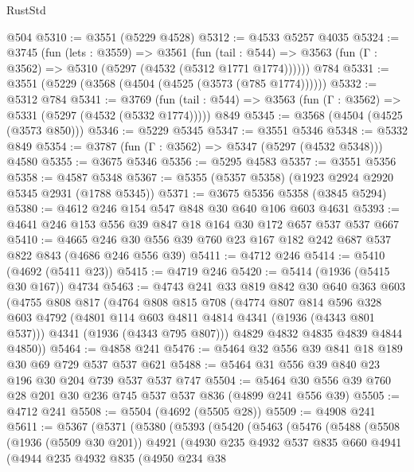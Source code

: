 \begin{lexlean}{RustStd}
\begin{coremodule}
    @504
@5310 := @3551 (@5229 @4528)
@5312 := @4533 @5257 @4035
@5324 := @3745
    (fun (lets : @3559) =>
    @3561
      (fun (tail : @544) => @3563 (fun (Γ : @3562) => @5310 (@5297 (@4532 (@5312 @1771 @1774))))))
    @784
@5331 := @3551 (@5229 (@3568 (@4504 (@4525 (@3573 (@785 @1774))))))
@5332 := @5312 @784
@5341 := @3769
    (fun (tail : @544) => @3563 (fun (Γ : @3562) => @5331 (@5297 (@4532 (@5332 @1774)))))
    @849
@5345 := @3568 (@4504 (@4525 (@3573 @850)))
@5346 := @5229 @5345
@5347 := @3551 @5346
@5348 := @5332 @849
@5354 := @3787 (fun (Γ : @3562) => @5347 (@5297 (@4532 @5348))) @4580
@5355 := @3675 @5346
@5356 := @5295 @4583
@5357 := @3551 @5356
@5358 := @4587 @5348
@5367 := @5355 (@5357 @5358) (@1923 @2924 @2920 @5345 @2931 (@1788 @5345))
@5371 := @3675 @5356 @5358 (@3845 @5294)
@5380 := @4612 @246 @154 @547 @848 @30 @640 @106 @603 @4631
@5393 := @4641 @246 @153 @556 @39 @847 @18 @164 @30 @172 @657 @537 @537 @667
@5410 := @4665 @246 @30 @556 @39 @760 @23 @167 @182 @242 @687 @537 @822 @843 (@4686 @246 @556 @39)
@5411 := @4712 @246
@5414 := @5410 (@4692 (@5411 @23))
@5415 := @4719 @246
@5420 := @5414 (@1936 (@5415 @30 @167)) @4734
@5463 := @4743
    @241
    @33
    @819
    @842
    @30
    @640
    @363
    @603
    (@4755
      @808
      @817
      (@4764
        @808
        @815
        @708
        (@4774
          @807
          @814
          @596
          @328
          @603
          @4792
          (@4801 @114 @603 @4811 @4814 @4341 (@1936 (@4343 @801 @537)))
          @4341
          (@1936 (@4343 @795 @807)))
        @4829
        @4832
        @4835
        @4839
        @4844
        @4850))
@5464 := @4858 @241
@5476 := @5464 @32 @556 @39 @841 @18 @189 @30 @69 @729 @537 @537 @621
@5488 := @5464 @31 @556 @39 @840 @23 @196 @30 @204 @739 @537 @537 @747
@5504 := @5464 @30 @556 @39 @760 @28 @201 @30 @236 @745 @537 @537 @836 (@4899 @241 @556 @39)
@5505 := @4712 @241
@5508 := @5504 (@4692 (@5505 @28))
@5509 := @4908 @241
@5611 := @5367
    (@5371
      (@5380
        (@5393
          (@5420
            (@5463
              (@5476
                (@5488
                  (@5508
                    (@1936 (@5509 @30 @201))
                    @4921
                    (@4930
                      @235
                      @4932
                      @537
                      @835
                      @660
                      @4941
                      (@4944
                        @235
                        @4932
                        @835
                        (@4950
                          @234
                          @38

\end{coremodule}
\end{lexlean}
